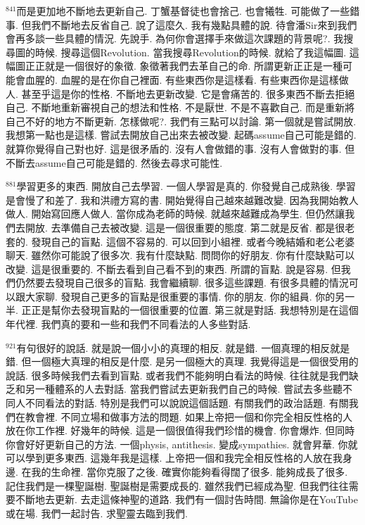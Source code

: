 \documentclass{book}
\begin{document}
$^{841}$而是更加地不斷地去更新自己.
丁蟹基督徒也會捨己.
也會犧牲.
可能做了一些錯事.
但我們不斷地去反省自己.
說了這麼久.
我有幾點具體的說.
待會潘Sir來到我們會再多談一些具體的情況.
先說手.
為何你會選擇手來做這次課題的背景呢?.
我搜尋圖的時候.
搜尋這個Revolution.
當我搜尋Revolution的時候.
就給了我這幅圖.
這幅圖正正就是一個很好的象徵.
象徵著我們去革自己的命.
所謂更新正正是一種可能會血腥的.
血腥的是在你自己裡面.
有些東西你是這樣看.
有些東西你是這樣做人.
甚至乎這是你的性格.
不斷地去更新改變.
它是會痛苦的.
很多東西不斷去拒絕自己.
不斷地重新審視自己的想法和性格.
不是厭世.
不是不喜歡自己.
而是重新將自己不好的地方不斷更新.
怎樣做呢?.
我們有三點可以討論.
第一個就是嘗試開放.
我想第一點也是這樣.
嘗試去開放自己出來去被改變.
起碼assume自己可能是錯的.
就算你覺得自己對也好.
這是很矛盾的.
沒有人會做錯的事.
沒有人會做對的事.
但不斷去assume自己可能是錯的.
然後去尋求可能性.

$^{881}$學習更多的東西.
開放自己去學習.
一個人學習是真的.
你發覺自己成熟後.
學習是會慢了和差了.
我和洪禮方寫的書.
開始覺得自己越來越難改變.
因為我開始教人做人.
開始寫回應人做人.
當你成為老師的時候.
就越來越難成為學生.
但仍然讓我們去開放.
去準備自己去被改變.
這是一個很重要的態度.
第二就是反省.
都是很老套的.
發現自己的盲點.
這個不容易的.
可以回到小組裡.
或者今晚結婚和老公老婆聊天.
雖然你可能說了很多次.
我有什麼缺點.
問問你的好朋友.
你有什麼缺點可以改變.
這是很重要的.
不斷去看到自己看不到的東西.
所謂的盲點.
說是容易.
但我們仍然要去發現自己很多的盲點.
我會繼續聊.
很多這些課題.
有很多具體的情況可以跟大家聊.
發現自己更多的盲點是很重要的事情.
你的朋友.
你的組員.
你的另一半.
正正是幫你去發現盲點的一個很重要的位置.
第三就是對話.
我想特別是在這個年代裡.
我們真的要和一些和我們不同看法的人多些對話.

$^{921}$有句很好的說話.
就是說一個小小的真理的相反.
就是錯.
一個真理的相反就是錯.
但一個極大真理的相反是什麼.
是另一個極大的真理.
我覺得這是一個很受用的說話.
很多時候我們去看到盲點.
或者我們不能夠明白看法的時候.
往往就是我們缺乏和另一種體系的人去對話.
當我們嘗試去更新我們自己的時候.
嘗試去多些聽不同人不同看法的對話.
特別是我們可以說說這個話題.
有關我們的政治話題.
有關我們在教會裡.
不同立場和做事方法的問題.
如果上帝把一個和你完全相反性格的人放在你工作裡.
好幾年的時候.
這是一個很值得我們珍惜的機會.
你會爆炸.
但同時你會好好更新自己的方法.
一個physis, antithesis.
變成sympathies.
就會昇華.
你就可以學到更多東西.
這幾年我是這樣.
上帝把一個和我完全相反性格的人放在我身邊.
在我的生命裡.
當你克服了之後.
確實你能夠看得闊了很多.
能夠成長了很多.
記住我們是一棵聖誕樹.
聖誕樹是需要成長的.
雖然我們已經成為聖.
但我們往往需要不斷地去更新.
去走這條神聖的道路.
我們有一個討告時間.
無論你是在YouTube或在場.
我們一起討告.
求聖靈去臨到我們.
\end{document}
